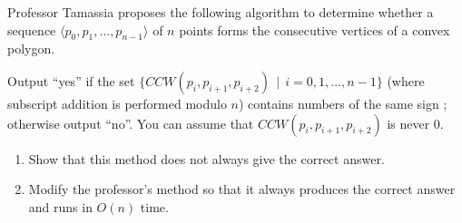 Professor Tamassia proposes the following algorithm to determine
whether a sequence $\langle  p_0,p_1,\ldots,p_{n-1} \rangle$  of $n$
points forms the consecutive vertices of a convex polygon.

Output ``yes'' if the set $\{CCW(p_i,p_{i+1},p_{i+2})~~|~~ i =

0,1,\ldots,n-1\}$ (where subscript addition is performed modulo $n$)
contains numbers of the same sign ; otherwise output ``no''. You can
assume that $CCW(p_i,p_{i+1},p_{i+2})$ is never 0.

\begin{enumerate}
\item  Show that this method does not always give the correct answer.
\item  Modify the professor's method so that it always produces the
correct answer and runs in $O(n)$ time.
\end{enumerate}
